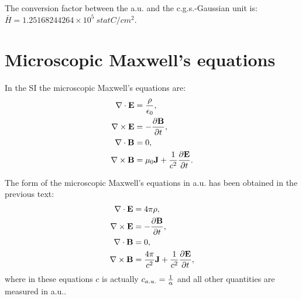 \documentclass[12pt,a4paper]{article}
\def\htoh{7.95774715242\times 10^{1}}
\def\barhcgs{1.25168244264\times 10^{5}}
\begin{document}


{\color{green} The conversion factor between the a.u. and the c.g.s.-Gaussian 
unit is:
$\bar H = \barhcgs\ statC/cm^2$.
}

\newpage
\section{\color{coral}Microscopic Maxwell's equations}
In the SI the microscopic Maxwell's equations are:
\begin{align}
\nabla \cdot {\bf E} &= {\rho\over {\epsilon_0}}, \\
\nabla \times {\bf E} &= -{\partial {\bf B} \over \partial t}, \\
\nabla \cdot {\bf B} &= 0, \\
\nabla \times {\bf B} &= \mu_0{\bf J}+ {1\over c^2}
{\partial {\bf E} \over \partial t}. 
\end{align}

{\color{web-blue} The form of the microscopic Maxwell's equations
in a.u. has been obtained in the previous text:
\begin{align}
\nabla \cdot {\bf E} &= 4 \pi \rho, \\
\nabla \times {\bf E} &= -{\partial {\bf B} \over \partial t}, \\
\nabla \cdot {\bf B} &= 0, \\
\nabla \times {\bf B} &= {4 \pi \over c^2} {\bf J}+ {1\over c^2}
{\partial {\bf E} \over \partial t}, 
\end{align}
where in these equations $c$ is actually $c_{a.u.}={1\over \alpha}$ and all 
other quantities are measured in a.u..
}
\\
\end{document}
